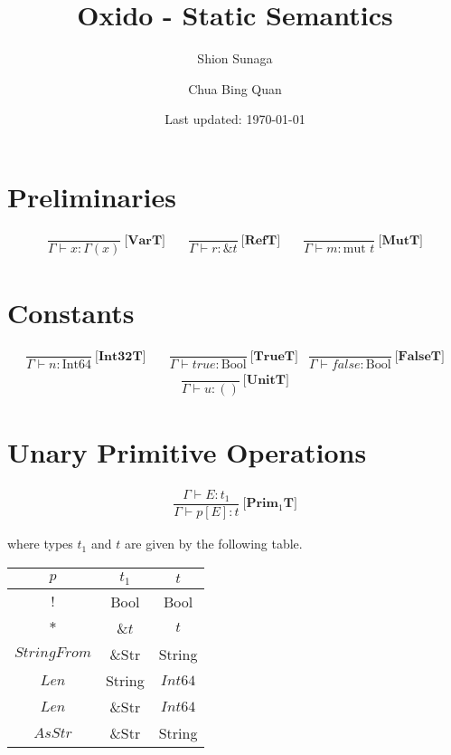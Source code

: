 \documentclass[11pt]{article}
\title{Oxido - Static Semantics}
\author{
    Shion Sunaga
    \and
    Chua Bing Quan
}
\date{Last updated: \today}
\begin{document}
    \maketitle

    \section*{Preliminaries}
    \begin{align*}
        \dfrac{}{\Gamma \vdash x : \Gamma(x)} \ \textbf{[VarT]} & \quad
        \dfrac{}{\Gamma \vdash r : \text{\&}t} \ \textbf{[RefT]} & \quad
        \dfrac{}{\Gamma \vdash m : \text{mut }t} \ \textbf{[MutT]}
    \end{align*}

    \section*{Constants}
    \begin{align*}
        \dfrac{}{\Gamma \vdash n : \text{Int64}} \ \textbf{[Int32T]} & \quad
        \dfrac{}{\Gamma \vdash true : \text{Bool}} \ \textbf{[TrueT]} &
        \dfrac{}{\Gamma \vdash false : \text{Bool}} \ \textbf{[FalseT]}
    \end{align*}
    \begin{align*}
        \dfrac{}{\Gamma \vdash u : ()} \ \textbf{[UnitT]}
    \end{align*}

    \section*{Unary Primitive Operations}
    \begin{align*}
        \dfrac{\Gamma \vdash E:t_1}{\Gamma \vdash p[E] : t} \ \textbf{[Prim$_1$T]}
    \end{align*}

    \begin{flushleft}
        where types $t_1$ and $t$ are given by the following table. \newline

        \begin{tabular}{|c|c|c|}
            \hline
            $p$ & $t_1$ & $t$ \\ \hline
            $!$ & Bool & Bool \\ \hline
            $*$ & \&$t$ & $t$ \\ \hline
            $StringFrom$ & \&Str & String \\ \hline
            $Len$ & String & $Int64$ \\ \hline
            $Len$ & \&Str & $Int64$ \\ \hline
            $AsStr$ & \&Str & String \\ \hline
        \end{tabular}
    \end{flushleft}
\end{document}
